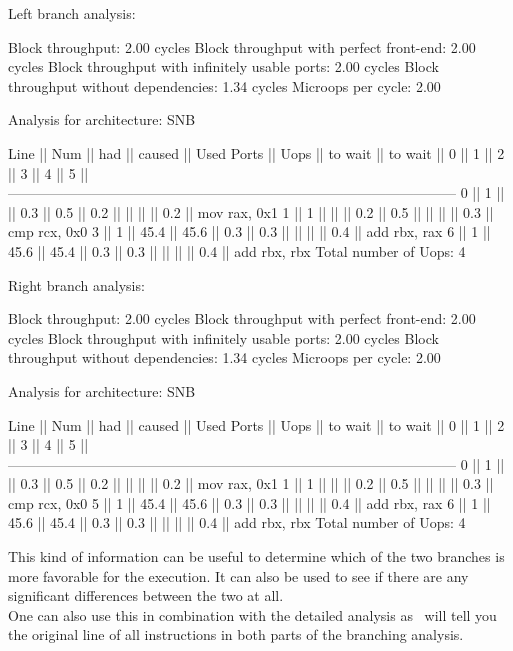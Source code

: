 \begin{example}
Left branch analysis:

Block throughput: 2.00 cycles
Block throughput with perfect front-end: 2.00 cycles
Block throughput with infinitely usable ports: 2.00 cycles
Block throughput without dependencies: 1.34 cycles
Microops per cycle: 2.00

Analysis for architecture: SNB

 Line  ||   Num   ||   had   || caused  ||            Used Ports
       ||   Uops  || to wait || to wait ||   0   ||   1   ||   2   ||   3   ||   4   ||   5   ||
 ------------------------------------------------------------------------------------------------
   0   ||    1    ||         ||   0.3   ||  0.5  ||  0.2  ||       ||       ||       ||  0.2  || mov rax, 0x1
   1   ||    1    ||         ||         ||  0.2  ||  0.5  ||       ||       ||       ||  0.3  || cmp rcx, 0x0
   3   ||    1    ||  45.4   ||  45.6   ||  0.3  ||  0.3  ||       ||       ||       ||  0.4  || add rbx, rax
   6   ||    1    ||  45.6   ||  45.4   ||  0.3  ||  0.3  ||       ||       ||       ||  0.4  || add rbx, rbx
Total number of Uops: 4


Right branch analysis:

Block throughput: 2.00 cycles
Block throughput with perfect front-end: 2.00 cycles
Block throughput with infinitely usable ports: 2.00 cycles
Block throughput without dependencies: 1.34 cycles
Microops per cycle: 2.00

Analysis for architecture: SNB

 Line  ||   Num   ||   had   || caused  ||            Used Ports
       ||   Uops  || to wait || to wait ||   0   ||   1   ||   2   ||   3   ||   4   ||   5   ||
 ------------------------------------------------------------------------------------------------
   0   ||    1    ||         ||   0.3   ||  0.5  ||  0.2  ||       ||       ||       ||  0.2  || mov rax, 0x1
   1   ||    1    ||         ||         ||  0.2  ||  0.5  ||       ||       ||       ||  0.3  || cmp rcx, 0x0
   5   ||    1    ||  45.4   ||  45.6   ||  0.3  ||  0.3  ||       ||       ||       ||  0.4  || add rbx, rax
   6   ||    1    ||  45.6   ||  45.4   ||  0.3  ||  0.3  ||       ||       ||       ||  0.4  || add rbx, rbx
Total number of Uops: 4
\end{example}

This kind of information can be useful to determine which of the two branches is more favorable for the execution. It can also be used to see if there are any significant differences between the two at all.\\
One can also use this in combination with the detailed analysis as \suaca\ will tell you the original line of all instructions in both parts of the branching analysis.


